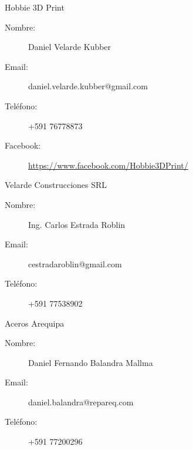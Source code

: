 \documentclass[a4paper,10pt]{article}
\begin{document}
\begin{thebibliography}{}

 Hobbie 3D Print
  \begin{description}
    \item[Nombre:] Daniel Velarde Kubber
    \item[Email:] daniel.velarde.kubber@gmail.com
    \item[Teléfono:] +591 76778873
    \item[Facebook:] \url{https://www.facebook.com/Hobbie3DPrint/}
  \end{description}

 Velarde Construcciones SRL
  \begin{description}
    \item[Nombre:] Ing. Carlos Estrada Roblin
    \item[Email:] cestradaroblin@gmail.com
    \item[Teléfono:] +591 77538902
  \end{description}

 Aceros Arequipa
  \begin{description}
    \item[Nombre:] Daniel Fernando Balandra Mallma
    \item[Email:] daniel.balandra@repareq.com
    \item[Teléfono:] +591 77200296
  \end{description}

\end{thebibliography}
\end{document}
